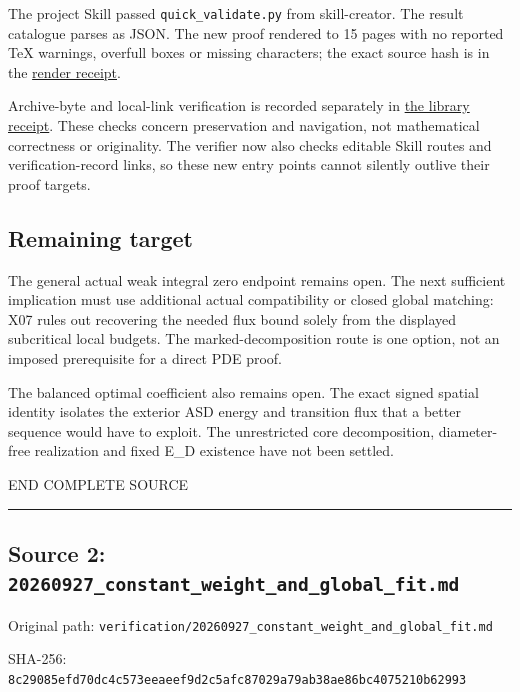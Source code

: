 \documentclass[
  10pt,
]{article}
\begin{document}
The project Skill passed \nolinkurl{quick_validate.py} from skill-creator.
The result catalogue parses as JSON. The new proof rendered to 15 pages
with no reported TeX warnings, overfull boxes or missing characters; the
exact source hash is in the
\href{20260927_marked_charge_render.json}{render receipt}.

Archive-byte and local-link verification is recorded separately in
\href{../catalog/verification.json}{the library receipt}. These checks
concern preservation and navigation, not mathematical correctness or
originality. The verifier now also checks editable Skill routes and
verification-record links, so these new entry points cannot silently
outlive their proof targets.

\hypertarget{remaining-target}{%
\subsection{Remaining target}\label{remaining-target}}

The general actual weak integral zero endpoint remains open. The next
sufficient implication must use additional actual compatibility or
closed global matching: X07 rules out recovering the needed flux bound
solely from the displayed subcritical local budgets. The
marked-decomposition route is one option, not an imposed prerequisite
for a direct PDE proof.

The balanced optimal coefficient also remains open. The exact signed
spatial identity isolates the exterior ASD energy and transition flux
that a better sequence would have to exploit. The unrestricted core
decomposition, diameter-free realization and fixed E\_D existence have
not been settled.

END COMPLETE SOURCE

\begin{center}\rule{0.5\linewidth}{0.5pt}\end{center}

\hypertarget{source-2-20260927_constant_weight_and_global_fit.md}{%
\subsection{Source 2:
\nolinkurl{20260927_constant_weight_and_global_fit.md}}\label{source-2-20260927_constant_weight_and_global_fit.md}}

Original path:
\nolinkurl{verification/20260927_constant_weight_and_global_fit.md}

SHA-256:
\nolinkurl{8c29085efd70dc4c573eeaeef9d2c5afc87029a79ab38ae86bc4075210b62993}
\end{document}
